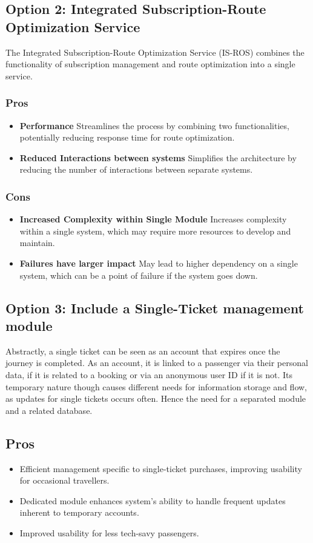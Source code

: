 \subsection*{Option 2: Integrated Subscription-Route Optimization Service}
The Integrated Subscription-Route Optimization Service (IS-ROS) combines the functionality of subscription management and route optimization into a single service. 
\subsubsection*{Pros}
\begin{itemize}[noitemsep]
    \item \textbf{Performance} Streamlines the process by combining two functionalities, potentially reducing response time for route optimization.
    \item \textbf{Reduced Interactions between systems} Simplifies the architecture by reducing the number of interactions between separate systems.
\end{itemize}
\subsubsection*{Cons}
\begin{itemize}[noitemsep]
    \item \textbf{Increased Complexity within Single Module} Increases complexity within a single system, which may require more resources to develop and maintain.
    \item \textbf{Failures have larger impact} May lead to higher dependency on a single system, which can be a point of failure if the system goes down.
\end{itemize}

\subsection*{Option 3: Include a Single-Ticket management module}
Abstractly, a single ticket can be seen as an account that expires once the journey is completed. As an account, it is linked to a passenger via their personal data, if it is related to a booking or via 
an anonymous user ID if it is not.
Its temporary nature though causes different needs for information storage and flow, as updates for single tickets occurs often.
Hence the need for a separated module and a related database.

\subsection*{Pros}
\begin{itemize}[noitemsep]
    \item Efficient management specific to single-ticket purchases, improving usability for occasional travellers.
    \item Dedicated module enhances system's ability to handle frequent updates inherent to temporary accounts.
    \item Improved usability for less tech-savy passengers.
\end{itemize}

